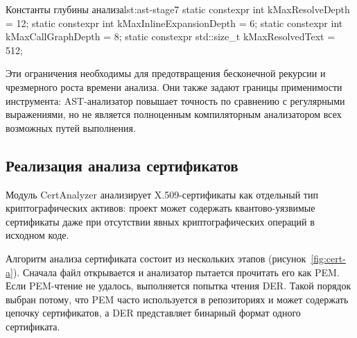 \documentclass{itmo-vkr}
\begin{document}
\begin{itmolisting}[C++]{Константы глубины анализа}{lst:ast-stage7}
    static constexpr int kMaxResolveDepth = 12;
    static constexpr int kMaxInlineExpansionDepth = 6;
    static constexpr int kMaxCallGraphDepth = 8;
    static constexpr std::size_t kMaxResolvedText = 512;
\end{itmolisting}

Эти ограничения необходимы для предотвращения бесконечной рекурсии и чрезмерного роста времени анализа. Они также задают границы применимости инструмента: AST-анализатор повышает точность по сравнению с регулярными выражениями, но не является полноценным компиляторным анализатором всех возможных путей выполнения.

\subsection{Реализация анализа сертификатов}

Модуль CertAnalyzer анализирует X.509-сертификаты как отдельный тип криптографических активов: проект может содержать квантово-уязвимые сертификаты даже при отсутствии явных криптографических операций в исходном коде.

Алгоритм анализа сертификата состоит из нескольких этапов (рисунок~\ref{fig:cert-a}). Сначала файл открывается и анализатор пытается прочитать его как PEM. Если PEM-чтение не удалось, выполняется попытка чтения DER. Такой порядок выбран потому, что PEM часто используется в репозиториях и может содержать цепочку сертификатов, а DER представляет бинарный формат одного сертификата.
\end{document}
